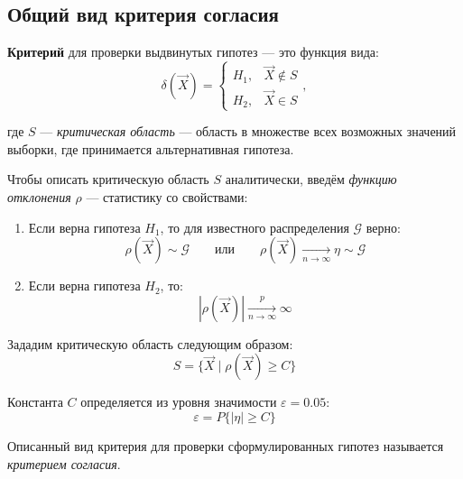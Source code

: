 \subsection{Общий вид критерия согласия}

\textbf{Критерий} для проверки выдвинутых гипотез --- это функция вида:
\[
    \delta(\vec{X})=
    \begin{cases}
        H_1, &\vec{X}\notin S\\
        H_2, &\vec{X}\in S
    \end{cases},
\]

где \( S \) --- \textit{критическая область} --- область в множестве всех возможных значений выборки, где принимается альтернативная гипотеза.

Чтобы описать критическую область \( S \) аналитически, введём \textit{функцию отклонения} \( \rho \) --- статистику со свойствами:

\begin{enumerate}
    \item Если верна гипотеза \( H_1 \), то для известного распределения \( \mathcal{G} \) верно:
    \[
        \rho(\vec{X})\sim\mathcal{G}\qquad\text{или}\qquad\rho(\vec{X})\xrightarrow[n\to\infty]{}\eta\sim\mathcal{G}
    \]
    \item Если верна гипотеза \( H_2 \), то:
    \[
        |\rho(\vec{X})|\xrightarrow[n\to\infty]{p}\infty
    \]
\end{enumerate}

Зададим критическую область следующим образом:
\[
    S=\{\vec{X}\mid\rho(\vec{X})\geq C\}
\]

Константа \( C \) определяется из уровня значимости \( \varepsilon=0.05 \):
\[
    \varepsilon=P\{|\eta|\geq C\}
\]

Описанный вид критерия для проверки сформулированных гипотез называется \textit{критерием согласия}.